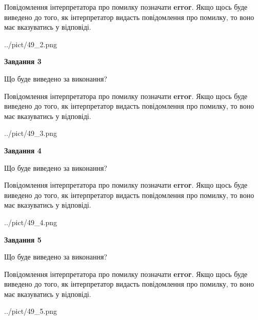 \documentclass[12pt, ukrainian]{article}
\begin{document}
{\begin {large}
Повідомлення інтерпретатора про помилку позначати \textbf{error}.
Якщо щось буде виведено до того, як інтерпретатор видасть повідомлення про помилку, 
то воно має вказуватись у відповіді. \par


\begin{center}
	{../pict/49_2.png}
\end{center}
\newpage

{\begin {center}\textbf{Завдання 3}\end {center}}\par
Що буде виведено за виконання?

Повідомлення інтерпретатора про помилку позначати \textbf{error}.
Якщо щось буде виведено до того, як інтерпретатор видасть повідомлення про помилку, 
то воно має вказуватись у відповіді. \par


\begin{center}
	{../pict/49_3.png}
\end{center}
\newpage

{\begin {center}\textbf{Завдання 4}\end {center}}\par
Що буде виведено за виконання?

Повідомлення інтерпретатора про помилку позначати \textbf{error}.
Якщо щось буде виведено до того, як інтерпретатор видасть повідомлення про помилку, 
то воно має вказуватись у відповіді. \par


\begin{center}
	{../pict/49_4.png}
\end{center}
\newpage

{\begin {center}\textbf{Завдання 5}\end {center}}\par
Що буде виведено за виконання?

Повідомлення інтерпретатора про помилку позначати \textbf{error}.
Якщо щось буде виведено до того, як інтерпретатор видасть повідомлення про помилку, 
то воно має вказуватись у відповіді. \par


\begin{center}
	{../pict/49_5.png}
\end{center}
\newpage


\end{large}}
\end{document}
